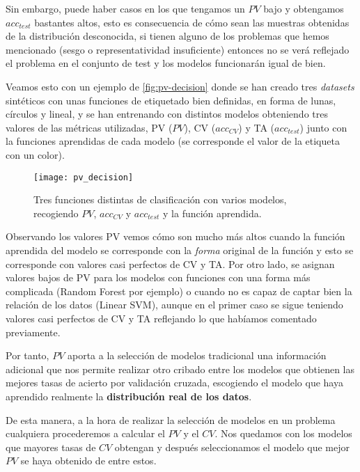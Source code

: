 Sin embargo, puede haber casos en los que tengamos un $PV$ bajo y obtengamos $acc_{test}$ bastantes altos, esto es consecuencia de cómo sean las muestras obtenidas de la distribución desconocida, si tienen alguno de los problemas que hemos mencionado (sesgo o representatividad insuficiente) entonces no se verá reflejado el problema en el conjunto de test y los modelos funcionarán igual de bien.

Veamos esto con un ejemplo de \cite{zhang2019perturbation} \autoref{fig:pv-decision} donde se han creado tres \emph{datasets} sintéticos con unas funciones de etiquetado bien definidas, en forma de lunas, círculos y lineal, y se han entrenando con distintos modelos obteniendo tres valores de las métricas utilizadas, PV ($PV$), CV ($acc_{CV}$) y TA ($acc_{test}$) junto con la funciones aprendidas de cada modelo (se corresponde el valor de la etiqueta con un color).

\begin{figure}[htpb]
  \centering
  \hspace*{-1.cm}
  \texttt{[image: pv\_decision]}
  \caption{Tres funciones distintas de clasificación con varios modelos, recogiendo $PV$, $acc_{CV}$ y $acc_{test}$ y la función aprendida.}
  \label{fig:pv-decision}
\end{figure}

Observando los valores PV vemos cómo son mucho más altos cuando la función aprendida del modelo se corresponde con la \emph{forma} original de la función y esto se corresponde con valores casi perfectos de CV y TA. Por otro lado, se asignan valores bajos de PV para los modelos con funciones con una forma más complicada (Random Forest por ejemplo) o cuando no es capaz de captar bien la relación de los datos (Linear SVM), aunque en el primer caso se sigue teniendo valores casi perfectos de CV y TA reflejando lo que habíamos comentado previamente.

Por tanto, $PV$ aporta a la selección de modelos tradicional una información adicional que nos permite realizar otro cribado entre los modelos que obtienen las mejores tasas de acierto por validación cruzada, escogiendo el modelo que haya aprendido realmente la \textbf{distribución real de los datos}.

De esta manera, a la hora de realizar la selección de modelos en un problema cualquiera procederemos a calcular el $PV$ y el $CV$. Nos quedamos con los modelos que mayores tasas de $CV$ obtengan y después seleccionamos el modelo que mejor $PV$ se haya obtenido de entre estos.

